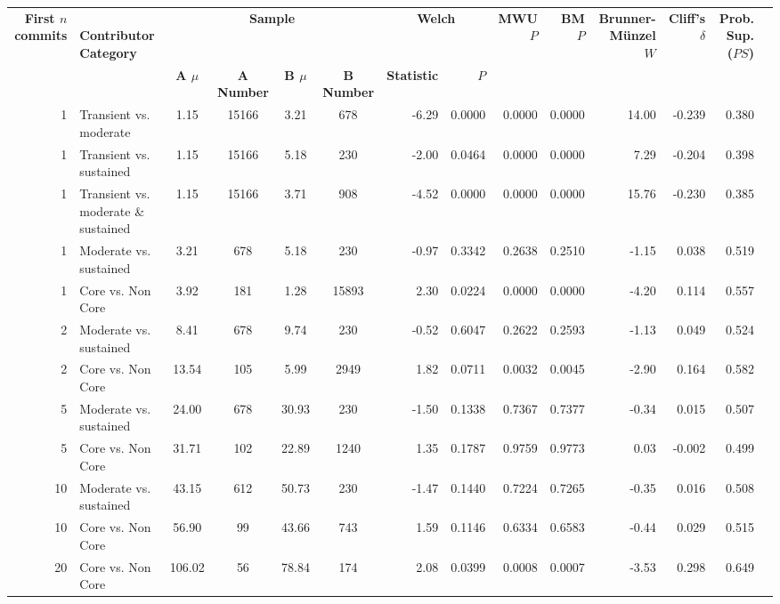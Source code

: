 \begin{landscape}
\begin{table}[H]
\begin{tabular}{r p{4cm} c c c c r r r r r r r r}
\toprule
\makecell[t]{\textbf{First $n$}\\\textbf{commits}} & \makecell[t]{\textbf{}\\\textbf{Contributor}\\\textbf{Category}} & \multicolumn{4}{c}{\textbf{Sample}} & \multicolumn{2}{c}{\textbf{Welch}} & \textbf{MWU $P$} & \textbf{BM $P$} & \makecell[t]{\textbf{}\\\textbf{Brunner-Münzel}\\\textbf{$W$}} & \makecell[t]{\textbf{Cliff's}\\\textbf{$\delta$}} & \makecell[t]{\textbf{Prob. Sup.}\\\textbf{($PS$)}} \\ 
\cmidrule(lr){3-6} \cmidrule(lr){7-8}
 &  & \textbf{A $\mu$} & \textbf{A Number} & \textbf{B $\mu$} & \textbf{B Number} & \textbf{Statistic} & \textbf{$P$} &  &  &  &  &  \\ 
\midrule
1 & Transient vs. moderate &  1.15 & 15166 & 3.21 & 678 & -6.29 & 0.0000 & 0.0000 & 0.0000 & 14.00 & -0.239 & 0.380 \\ 
1 & Transient vs. sustained &  1.15 & 15166 & 5.18 & 230 & -2.00 & 0.0464 & 0.0000 & 0.0000 & 7.29 & -0.204 & 0.398 \\ 
1 & Transient vs. moderate \& sustained &  1.15 & 15166 & 3.71 & 908 & -4.52 & 0.0000 & 0.0000 & 0.0000 & 15.76 & -0.230 & 0.385 \\ 
1 & Moderate vs. sustained &  3.21 & 678 & 5.18 & 230 & -0.97 & 0.3342 & 0.2638 & 0.2510 & -1.15 & 0.038 & 0.519 \\ 
1 & Core vs. Non Core &  3.92 & 181 & 1.28 & 15893 & 2.30 & 0.0224 & 0.0000 & 0.0000 & -4.20 & 0.114 & 0.557 \\ 
2 & Moderate vs. sustained &  8.41 & 678 & 9.74 & 230 & -0.52 & 0.6047 & 0.2622 & 0.2593 & -1.13 & 0.049 & 0.524 \\ 
2 & Core vs. Non Core &  13.54 & 105 & 5.99 & 2949 & 1.82 & 0.0711 & 0.0032 & 0.0045 & -2.90 & 0.164 & 0.582 \\ 
5 & Moderate vs. sustained &  24.00 & 678 & 30.93 & 230 & -1.50 & 0.1338 & 0.7367 & 0.7377 & -0.34 & 0.015 & 0.507 \\ 
5 & Core vs. Non Core &  31.71 & 102 & 22.89 & 1240 & 1.35 & 0.1787 & 0.9759 & 0.9773 & 0.03 & -0.002 & 0.499 \\ 
10 & Moderate vs. sustained &  43.15 & 612 & 50.73 & 230 & -1.47 & 0.1440 & 0.7224 & 0.7265 & -0.35 & 0.016 & 0.508 \\ 
10 & Core vs. Non Core &  56.90 & 99 & 43.66 & 743 & 1.59 & 0.1146 & 0.6334 & 0.6583 & -0.44 & 0.029 & 0.515 \\ 
20 & Core vs. Non Core &  106.02 & 56 & 78.84 & 174 & 2.08 & 0.0399 & 0.0008 & 0.0007 & -3.53 & 0.298 & 0.649 \\ 
\bottomrule
\end{tabular}%
\label{tab:codebase_graph_latex_repository_graph_component_time_series_statistical_significance_test_classes} 
\end{table}
\end{landscape}
\newpage 
